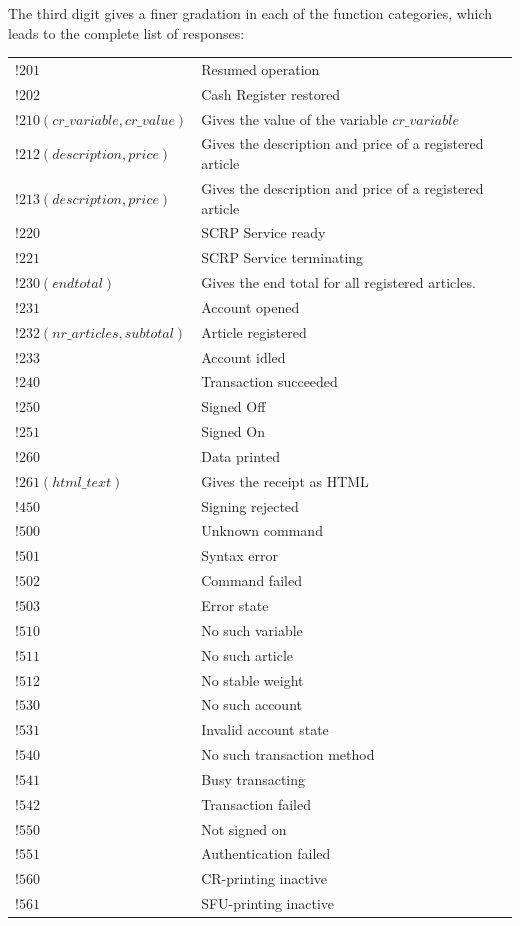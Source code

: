 The third digit gives a finer gradation in each of the function categories, which leads to the complete list of responses:
\vspace{5px} \\
\begin{tabular}{ll}
$!201$ & Resumed operation\\ 
$!202$ & Cash Register restored\\ 
$!210(cr\_variable, cr\_value)$ & Gives the value of the variable $\mathit{cr\_variable}$\\ 
$!212(description,price)$ & Gives the description and price of a registered article\\ 
$!213(description,price)$ & Gives the description and price of a registered article\\ 
$!220$ & SCRP Service ready\\ 
$!221$ & SCRP Service terminating\\ 
$!230(endtotal)$ & Gives the end total for all registered articles.\\ 
$!231$ & Account opened\\ 
$!232(nr\_articles,subtotal)$ & Article registered\\ 
$!233$ & Account idled\\ 
$!240$ & Transaction succeeded\\ 
$!250$ & Signed Off\\ 
$!251$ & Signed On\\ 
$!260$ & Data printed\\ 
$!261(html\_text)$ & Gives the receipt as HTML\\ 
$!450$ & Signing rejected\\ 
$!500$ & Unknown command\\ 
$!501$ & Syntax error\\ 
$!502$ & Command failed\\ 
$!503$ & Error state \\ 
$!510$ & No such variable\\ 
$!511$ & No such article\\ 
$!512$ & No stable weight\\ 
$!530$ & No such account\\ 
$!531$ & Invalid account state\\ 
$!540$ & No such transaction method\\ 
$!541$ & Busy transacting\\ 
$!542$ & Transaction failed\\ 
$!550$ & Not signed on\\ 
$!551$ & Authentication failed\\ 
$!560$ & CR-printing inactive \\
$!561$ & SFU-printing inactive
\end{tabular}

